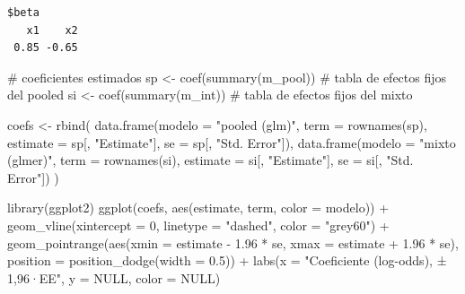 \documentclass[
  letterpaper,
  DIV=11,
  numbers=noendperiod]{scrartcl}
\newenvironment{Shaded}{\begin{snugshade}}{\end{snugshade}}
\newcommand{\AttributeTok}[1]{\textcolor[rgb]{0.40,0.45,0.13}{#1}}
\newcommand{\CommentTok}[1]{\textcolor[rgb]{0.37,0.37,0.37}{#1}}
\newcommand{\ConstantTok}[1]{\textcolor[rgb]{0.56,0.35,0.01}{#1}}
\newcommand{\DecValTok}[1]{\textcolor[rgb]{0.68,0.00,0.00}{#1}}
\newcommand{\FloatTok}[1]{\textcolor[rgb]{0.68,0.00,0.00}{#1}}
\newcommand{\FunctionTok}[1]{\textcolor[rgb]{0.28,0.35,0.67}{#1}}
\newcommand{\NormalTok}[1]{\textcolor[rgb]{0.00,0.23,0.31}{#1}}
\newcommand{\OtherTok}[1]{\textcolor[rgb]{0.00,0.23,0.31}{#1}}
\newcommand{\SpecialCharTok}[1]{\textcolor[rgb]{0.37,0.37,0.37}{#1}}
\newcommand{\StringTok}[1]{\textcolor[rgb]{0.13,0.47,0.30}{#1}}
\begin{document}
\begin{Shaded}
\end{Shaded}

\begin{verbatim}
$beta
   x1    x2 
 0.85 -0.65 
\end{verbatim}

\begin{Shaded}
\begin{Highlighting}[]
\CommentTok{\# coeficientes estimados}
\NormalTok{sp }\OtherTok{\textless{}{-}} \FunctionTok{coef}\NormalTok{(}\FunctionTok{summary}\NormalTok{(m\_pool))   }\CommentTok{\# tabla de efectos fijos del pooled}
\NormalTok{si }\OtherTok{\textless{}{-}} \FunctionTok{coef}\NormalTok{(}\FunctionTok{summary}\NormalTok{(m\_int))    }\CommentTok{\# tabla de efectos fijos del mixto}

\NormalTok{coefs }\OtherTok{\textless{}{-}} \FunctionTok{rbind}\NormalTok{(}
  \FunctionTok{data.frame}\NormalTok{(}\AttributeTok{modelo =} \StringTok{"pooled (glm)"}\NormalTok{,  }\AttributeTok{term =} \FunctionTok{rownames}\NormalTok{(sp),}
             \AttributeTok{estimate =}\NormalTok{ sp[, }\StringTok{"Estimate"}\NormalTok{], }\AttributeTok{se =}\NormalTok{ sp[, }\StringTok{"Std. Error"}\NormalTok{]),}
  \FunctionTok{data.frame}\NormalTok{(}\AttributeTok{modelo =} \StringTok{"mixto (glmer)"}\NormalTok{, }\AttributeTok{term =} \FunctionTok{rownames}\NormalTok{(si),}
             \AttributeTok{estimate =}\NormalTok{ si[, }\StringTok{"Estimate"}\NormalTok{], }\AttributeTok{se =}\NormalTok{ si[, }\StringTok{"Std. Error"}\NormalTok{])}
\NormalTok{)}

\FunctionTok{library}\NormalTok{(ggplot2)}
\FunctionTok{ggplot}\NormalTok{(coefs, }\FunctionTok{aes}\NormalTok{(estimate, term, }\AttributeTok{color =}\NormalTok{ modelo)) }\SpecialCharTok{+}
  \FunctionTok{geom\_vline}\NormalTok{(}\AttributeTok{xintercept =} \DecValTok{0}\NormalTok{, }\AttributeTok{linetype =} \StringTok{"dashed"}\NormalTok{, }\AttributeTok{color =} \StringTok{"grey60"}\NormalTok{) }\SpecialCharTok{+}
  \FunctionTok{geom\_pointrange}\NormalTok{(}\FunctionTok{aes}\NormalTok{(}\AttributeTok{xmin =}\NormalTok{ estimate }\SpecialCharTok{{-}} \FloatTok{1.96} \SpecialCharTok{*}\NormalTok{ se, }\AttributeTok{xmax =}\NormalTok{ estimate }\SpecialCharTok{+} \FloatTok{1.96} \SpecialCharTok{*}\NormalTok{ se),}
                  \AttributeTok{position =} \FunctionTok{position\_dodge}\NormalTok{(}\AttributeTok{width =} \FloatTok{0.5}\NormalTok{)) }\SpecialCharTok{+}
  \FunctionTok{labs}\NormalTok{(}\AttributeTok{x =} \StringTok{"Coeficiente (log{-}odds), ± 1,96·EE"}\NormalTok{, }\AttributeTok{y =} \ConstantTok{NULL}\NormalTok{, }\AttributeTok{color =} \ConstantTok{NULL}\NormalTok{)}
\end{Highlighting}
\end{Shaded}
\end{document}
